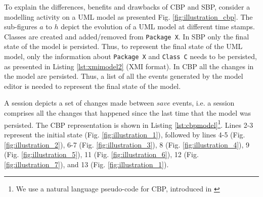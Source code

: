 \documentclass{llncs}
\begin{document}
\vspace{-10pt}
To explain the differences, benefits and drawbacks of CBP and SBP, consider a modelling activity on a UML model as presented Fig. \ref{fig:illustration_cbp}. The sub-figures $a$ to $h$ depict the evolution of a UML model at different time stamps. Classes are created and added/removed from \texttt{Package X}. In SBP only the final state of the model is persisted. Thus, to represent the final state of the UML model, only the information about \texttt{Package X} and \texttt{Class C} needs to be persisted, as presented in Listing \ref{lst:xmimodel2} (XMI format). In CBP all the changes in the model are persisted. Thus, a list of all the events generated by the model editor is needed to represent the final state of the model.

A session depicts a set of changes made between $save$ events, i.e. a session comprises all the changes that happened since the last time that the model was persisted. The CBP representation is shown in Listing \ref{lst:cbpmodel}\footnote{We use a natural language pseudo-code for CBP, introduced in \cite{DBLP:conf/models/YohannisKP17,yohannis2018towards}}. Lines 2-3 represent the initial state (Fig. \ref{fig:illustration_1}), followed by lines 4-5 (Fig. \ref{fig:illustration_2}), 6-7 (Fig. \ref{fig:illustration_3}), 8 (Fig. \ref{fig:illustration_4}), 9 (Fig. \ref{fig:illustration_5}), 11 (Fig. \ref{fig:illustration_6}), 12 (Fig. \ref{fig:illustration_7}), and 13 (Fig. \ref{fig:illustration_1}). 
\end{document}
